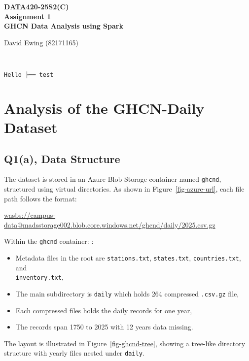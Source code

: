\documentclass[11pt]{article}
\newcommand{\customtitle}{
    \begin{center}
        \vspace*{3cm}
        
        {\Large\textsf{\textbf{DATA420-25S2(C)}}}\\
        \vspace{0.3cm} 
        {\large\textsf{\textbf{Assignment 1}}}\\
        \vspace{5cm}
        {\Large\textsf{\textbf{GHCN Data Analysis using Spark}}}\\
        \vfill
        {\large David Ewing (82171165)\par}
        \vspace{0.3cm}
        \DTMsetdatestyle{iso}
        {\large\textsf{ \DTMnow}}\\
        
        \vspace{3cm}
    \end{center}
    \thispagestyle{empty}
}
\begin{document}
\renewcommand{\familydefault}{\sfdefault}
\customtitle
\renewcommand{\familydefault}{\sfdefault}
\newpage 

\setmonofont{Consolas}
\begin{verbatim}
Hello ├── test
\end{verbatim}
\setmonofont{Courier New}
\cite{testentry}

\section{Analysis of the GHCN-Daily Dataset} 
\subsection{Q1(a), Data Structure }
\FloatBarrier
The dataset is stored in an Azure Blob Storage container named \texttt{ghcnd}, structured using virtual directories. As shown in Figure~\ref{fig-azure-url}, each file path follows the format:

\begin{center}
    \url{wasbs://campus-data@madsstorage002.blob.core.windows.net/ghcnd/daily/2025.csv.gz}
    \end{center}

    Within the \texttt{ghcnd} container: :
    \begin{itemize}
        \item Metadata files in the root are  \texttt{stations.txt}, \texttt{states.txt}, \texttt{countries.txt}, and\\ \texttt{inventory.txt},
        \item The main subdirectory is \texttt{daily} which holds 264 compressed \texttt{.csv.gz} file, 
        \item Each compressed files  holds the daily records for one year, 
        \item The records span 1750 to 2025 with 12 years data missing. 
    \end{itemize}
    The layout is illustrated in Figure~\ref{fig-ghcnd-tree}, showing a tree-like directory structure with yearly files nested under \texttt{daily}.

\bigskip
\end{document}
